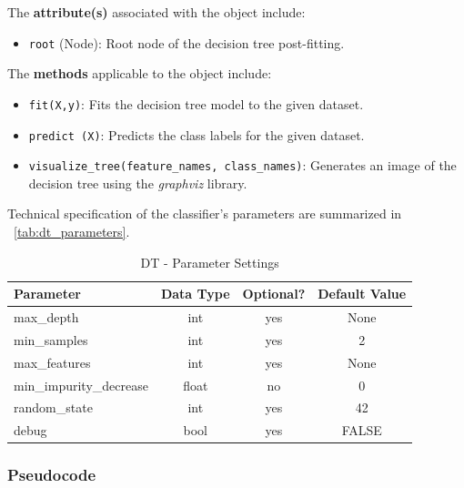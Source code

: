 \begin{appendices}
  The \textbf{attribute(s)} associated with the object include:
  \begin{itemize}
    \item \texttt{root} (Node): Root node of the decision tree post-fitting.
  \end{itemize}

  The \textbf{methods} applicable to the object include:
  \begin{itemize}
    \item \texttt{fit(X,y)}: Fits the decision tree model to the given dataset.
    \item \texttt{predict (X)}: Predicts the class labels for the given dataset.
    \item \texttt{visualize\_tree(feature\_names, class\_names)}: Generates an image of the decision tree using the \textit{graphviz} library.
  \end{itemize}

  Technical specification of the classifier's parameters are summarized in ~\autoref{tab:dt_parameters}.

  \begin{table}[H]
    \centering
    \begin{tabular}{lccc}
      \toprule
      \textbf{Parameter}      & \textbf{Data Type} & \textbf{Optional?} & \textbf{Default Value} \\
      \midrule
      max\_depth              & int                & yes                & None                   \\
      min\_samples            & int                & yes                & 2                      \\
      max\_features           & int                & yes                & None                   \\
      min\_impurity\_decrease & float              & no                 & 0                      \\
      random\_state           & int                & yes                & 42                     \\
      debug                   & bool               & yes                & FALSE                  \\
      \bottomrule
    \end{tabular}
    \caption{DT - Parameter Settings}
    \label{tab:dt_parameters}
  \end{table}

  \subsubsection{Pseudocode}


\end{appendices}
